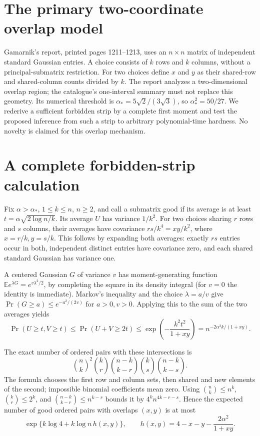 \documentclass[11pt]{article}
\begin{document}
\section{The primary two-coordinate overlap model}
Gamarnik's report, printed pages 1211--1213, uses an $n\times n$
matrix of independent standard Gaussian entries. A choice consists of
$k$ rows and $k$ columns, without a principal-submatrix restriction.
For two choices define $x$ and $y$ as their shared-row and shared-column
counts divided by $k$. The report analyzes a two-dimensional overlap
region; the catalogue's one-interval summary must not replace this
geometry. Its numerical threshold is
$\alpha_* =5\sqrt2/(3\sqrt3)$, so $\alpha_*^2=50/27$.
We rederive a sufficient forbidden strip by a complete first moment
and test the proposed inference from such a strip to arbitrary
polynomial-time hardness. No novelty is claimed for this overlap mechanism.

\section{A complete forbidden-strip calculation}
Fix $\alpha>\alpha_*$, $1\le k\le n$, $n\ge2$, and call a submatrix
good if its average is at least
$t=\alpha\sqrt{2\log n/k}$. Its average $U$ has variance $1/k^2$.
For two choices sharing $r$ rows and $s$ columns, their averages have
covariance $rs/k^4=xy/k^2$, where $x=r/k,y=s/k$.
This follows by expanding both averages: exactly $rs$ entries occur
in both, independent distinct entries have covariance zero, and each
shared standard Gaussian has variance one.

A centered Gaussian $G$ of variance $v$ has moment-generating function
$\mathbb E e^{\lambda G}=e^{v\lambda^2/2}$, by completing the square
in its density integral (for $v=0$ the identity is immediate).
Markov's inequality and the choice $\lambda=a/v$ give
$\Pr(G\ge a)\le e^{-a^2/(2v)}$ for $a>0,v>0$.
Applying this to the sum of the two averages yields
\[
\Pr(U\ge t,V\ge t)
\le\Pr(U+V\ge2t)
\le\exp\!\left(-\frac{k^2t^2}{1+xy}\right)
=n^{-2\alpha^2k/(1+xy)}.
\]

The exact number of ordered pairs with these intersections is
\[
\binom nk^2\binom kr\binom{n-k}{k-r}
                  \binom ks\binom{n-k}{k-s}.
\]
The formula chooses the first row and column sets, then shared and
new elements of the second; impossible binomial coefficients mean zero.
Using $\binom nk\le n^k$, $\binom kr\le2^k$, and
$\binom{n-k}{k-r}\le n^{k-r}$ bounds it by
$4^k n^{4k-r-s}$. Hence the expected number of good ordered pairs
with overlaps $(x,y)$ is at most
\[
\exp\{k\log4+k\log n\,h(x,y)\},\qquad
h(x,y)=4-x-y-\frac{2\alpha^2}{1+xy}.
\]
\end{document}
